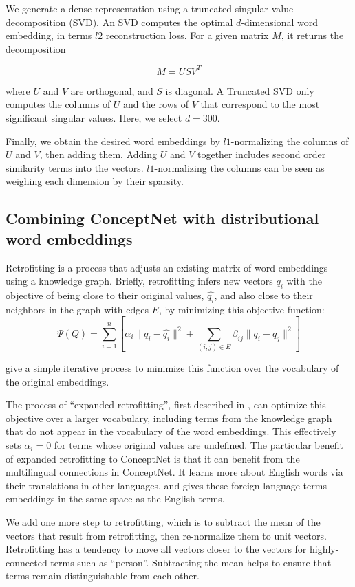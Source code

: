 \documentclass[letterpaper]{article}
\begin{document}
We generate a dense representation using a truncated singular value
decomposition (SVD). An SVD computes the optimal $d$-dimensional word embedding,
in terms $l2$ reconstruction loss. For a given matrix $M$, it returns the
decomposition

$$
M = USV^T
$$

where $U$ and $V$ are orthogonal, and $S$ is diagonal. A Truncated SVD only
computes the columns of $U$ and the rows of $V$ that correspond to the most
significant singular values. Here, we select $d=300$.

Finally, we obtain the desired word embeddings by $l1$-normalizing the columns
of $U$ and $V$, then adding them. Adding $U$ and $V$ together includes second
order similarity terms into the vectors. $l1$-normalizing the columns can be
seen as weighing each dimension by their sparsity.

\subsection{Combining ConceptNet with distributional word embeddings}

Retrofitting \cite{faruqui2015retrofitting} is a process that adjusts an
existing matrix of word embeddings using a knowledge graph. Briefly, retrofitting
infers new vectors $q_i$ with the objective of being close to their original
values, $\hat{q_i}$, and also close to their neighbors in the graph with edges $E$,
by minimizing this objective function:
$$\Psi(Q) = \sum_{i=1}^{n}\left[
    \alpha_i \lVert q_i - \hat{q_i} \rVert ^2 + \sum_{(i, j) \in E} \beta_{ij} \lVert q_i - q_j \rVert ^2
\right] $$

\citeauthor{faruqui2015retrofitting} give a simple iterative process to minimize
this function over the vocabulary of the original embeddings.

The process of ``expanded retrofitting'', first described in
\cite{speer2016ensemble}, can optimize this objective over a larger vocabulary,
including terms from the knowledge graph that do not appear in the vocabulary
of the word embeddings. This effectively sets $\alpha_i = 0$ for terms whose
original values are undefined. The particular benefit of expanded retrofitting
to ConceptNet is that it can benefit from the multilingual connections in
ConceptNet. It learns more about English words via their translations in other
languages, and gives these foreign-language terms embeddings in the same space
as the English terms.

We add one more step to retrofitting, which is to subtract the mean of the
vectors that result from retrofitting, then re-normalize them to unit vectors.
Retrofitting has a tendency to move all vectors closer to the vectors for
highly-connected terms such as ``person''. Subtracting the mean helps to ensure
that terms remain distinguishable from each other.
\end{document}
